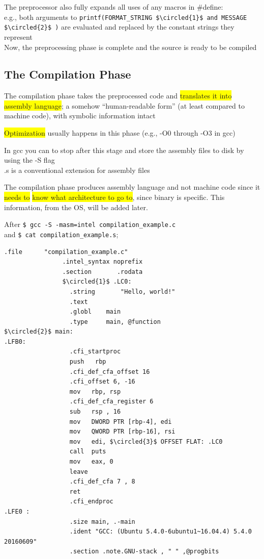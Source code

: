 \documentclass[]{project_plan}
\newcommand*\circled[1]{\tikz[baseline=(char.base)]{
            \node[shape=circle,draw,inner sep=2pt] (char) {#1};}}
\begin{document}
The preprocessor also fully expands all uses of any macros in \#define:\\
e.g., both arguments to \lstinline[mathescape]|printf(FORMAT_STRING $\circled{1}$ and MESSAGE $\circled{2}$ )|
are evaluated and replaced by the constant strings they represent\\

Now, the preprocessing phase is complete and the source is ready to be compiled

\subsection{The Compilation Phase}

The compilation phase takes the preprocessed code and \colorbox{yellow}{translates it into
  assembly language};
a somehow “human-readable form” (at least compared to machine code),
with symbolic information intact

\colorbox{yellow}{Optimization} usually happens in this phase (e.g., -O0 through -O3 in gcc)

In gcc you can to stop after this stage and store the assembly files
to disk by using the -S flag\\
.s is a conventional extension for assembly files

The compilation phase produces assembly language and not machine code
since it \colorbox{yellow}{needs to} \colorbox{yellow}{know what architecture to go to}, since binary is specific.
This information, from the OS, will be added later.

After \lstinline|$ gcc -S -masm=intel compilation_example.c|\\
and \lstinline|$ cat compilation_example.s|;
\begin{lstlisting}[mathescape]
                .file      "compilation_example.c"
                .intel_syntax noprefix
                .section       .rodata
                $\circled{1}$ .LC0:
                  .string       "Hello, world!"
                  .text
                  .globl    main
                  .type     main, @function
$\circled{2}$ main:
.LFB0:
                  .cfi_startproc
                  push   rbp
                  .cfi_def_cfa_offset 16
                  .cfi_offset 6, -16
                  mov   rbp, rsp
                  .cfi_def_cfa_register 6
                  sub   rsp , 16
                  mov   DWORD PTR [rbp-4], edi
                  mov   QWORD PTR [rbp-16], rsi
                  mov   edi, $\circled{3}$ OFFSET FLAT: .LC0
                  call  puts
                  mov   eax, 0
                  leave
                  .cfi_def_cfa 7 , 8
                  ret
                  .cfi_endproc
.LFE0 :
                  .size main, .-main
                  .ident "GCC: (Ubuntu 5.4.0-6ubuntu1~16.04.4) 5.4.0 20160609"
                  .section .note.GNU-stack , " " ,@progbits
\end{lstlisting}
\end{document}

